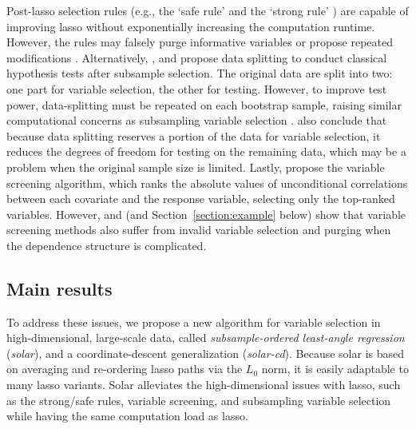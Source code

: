 \documentclass[11pt,review,authoryear]{elsarticle}
\begin{document}
Post-lasso selection rules (e.g., the `safe rule' \citep{ghaoui2010safe} and the `strong rule' \citep{tibshirani2012strong}) are capable of improving lasso without exponentially increasing the computation runtime. However, the rules may falsely purge informative variables or propose repeated modifications \citep{wang2014safe, zeng2017efficient}. Alternatively, \citet{wasserman2009high}, \citet{meinshausen2009p} and \citet{barber2019knockoff} propose data splitting to conduct classical hypothesis tests after subsample selection. The original data are split into two: one part for variable selection, the other for testing. However, to improve test power, data-splitting must be repeated on each bootstrap sample, raising similar computational concerns as subsampling variable selection \citep{bach2008bolasso,meinshausen2010stability}. \citet{diciccio2020exact} also conclude that because data splitting reserves a portion of the data for variable selection, it reduces the degrees of freedom for testing on the remaining data, which may be a problem when the original sample size is limited. Lastly, \citet{fan2008sure} propose the variable screening algorithm, which ranks the absolute values of unconditional correlations between each covariate and the response variable, selecting only the top-ranked variables. However, \citet{fan2008sure} and \citet{barut2016conditional} (and Section~\ref{section:example} below) show that variable screening methods also suffer from invalid variable selection and purging when the dependence structure is complicated.

\subsection{Main results}

To address these issues, we propose a new algorithm for variable selection in high-dimensional, large-scale data, called \emph{subsample-ordered least-angle regression} (\emph{solar}), and a coordinate-descent generalization (\emph{solar-cd}). Because solar is based on averaging and re-ordering lasso paths via the $L_0$ norm, it is easily adaptable to many lasso variants. Solar alleviates the high-dimensional issues with lasso, such as the strong/safe rules, variable screening, and subsampling variable selection while having the same computation load as lasso.
\end{document}
